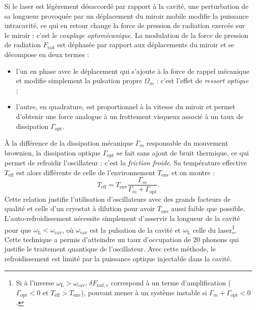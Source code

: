 \documentclass[12pt,a4paper]{article}
\begin{document}
Si le laser est légèrement désaccordé par rapport à la cavité, une perturbation de sa longueur provoquée par un déplacement du miroir mobile modifie la puissance intracavité, ce qui en retour change la force de pression de radiation exercée sur le miroir : c'est le \textit{couplage optomécanique}.
La modulation de la force de pression de radiation $F_\mathrm{rad}$ est déphasée par rapport aux déplacements du miroir et se décompose en deux termes :
\begin{itemize}
\item l'un en phase avec le déplacement qui s'ajoute à la force de rappel mécanique et modifie simplement la pulsation propre $\Omega_m$ : c'est l'effet de \textit{ressort optique} ;
\item l'autre, en quadrature, est proportionnel à la vitesse du miroir et permet d'obtenir une force analogue à un frottement visqueux associé à un taux de dissipation $\Gamma_\mathrm{opt}$.
\end{itemize}

À la différence de la dissipation mécanique $\Gamma_m$ responsable du mouvement brownien, la dissipation optique $\Gamma_\mathrm{opt}$ se fait sans ajout de bruit thermique, ce qui permet de refroidir l'oscillateur : c'est la \textit{friction froide}.
Sa température effective $T_\mathrm{eff}$ est alors différente de celle de l'environnement $T_\mathrm{env}$ et on montre :
\begin{equation}
T_\mathrm{eff} = T_\mathrm{env} \frac{\Gamma_m}{\Gamma_m+\Gamma_\mathrm{opt}}.
\end{equation}
Cette relation justifie l'utilisation d'oscillateurs avec des grands facteurs de qualité et celle d'un cryostat à dilution pour avoir $T_\mathrm{env}$ aussi faible que possible.
L'auto-refroidissement nécessite \og simplement \fg{} d'asservir la longueur de la cavité pour que $\omega_\mathrm{L} < \omega_\mathrm{cav}$, où $\omega_\mathrm{cav}$ est la pulsation de la cavité et $\omega_\mathrm{L}$ celle du laser\footnote{Si à l'inverse $\omega_\mathrm{L} > \omega_\mathrm{cav}$, $\delta F_{\mathrm{rad}, v}$ correspond à un terme d'amplification ($\Gamma_\mathrm{opt} < 0 $ et $T_\mathrm{eff} > T_\mathrm{env}$), pouvant mener à un système instable si $\Gamma_m + \Gamma_\mathrm{opt} < 0$.}.
Cette technique a permis d'atteindre un taux d'occupation de 20 phonons qui justifie le traitement quantique de l'oscillateur.
Avec cette méthode, le refroidissement est limité par la puissance optique injectable dans la cavité.
\end{document}
